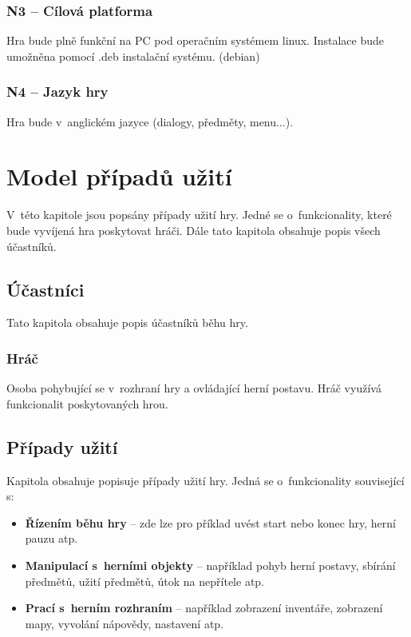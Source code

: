 \documentclass[12pt,a4paper]{article}
\begin{document}
\subsubsection{N3 -- Cílová platforma}
Hra bude plně funkční na PC pod operačním systémem linux. Instalace bude
umožněna pomocí .deb instalační systému. (debian)

\subsubsection{N4 -- Jazyk hry}
Hra bude v~anglickém jazyce (dialogy, předměty, menu$\dots$).

\newpage

\section{Model případů užití}
V~této kapitole jsou popsány případy užití hry. Jedné se o~funkcionality, které
bude vyvíjená hra poskytovat hráči. Dále tato kapitola obsahuje popis všech
účastníků.

\subsection{Účastníci}
Tato kapitola obsahuje popis účastníků běhu hry.

\subsubsection{Hráč}
Osoba pohybující se v~rozhraní hry a ovládající herní postavu. Hráč využívá
funkcionalit poskytovaných hrou.


\subsection{Případy užití}
Kapitola obsahuje popisuje případy užití hry. Jedná se o~funkcionality související s:

\begin{itemize}
  \item{\textbf{Řízením běhu hry} -- zde lze pro příklad uvést start nebo konec hry, herní
    pauzu atp.}
  \item{\textbf{Manipulací s~herními objekty} -- například pohyb herní postavy, sbírání
    předmětů, užití předmětů, útok na nepřítele atp.}
  \item{\textbf{Prací s~herním rozhraním} -- například zobrazení inventáře,
    zobrazení mapy, vyvolání nápovědy, nastavení atp.}
\end{itemize}
\end{document}
